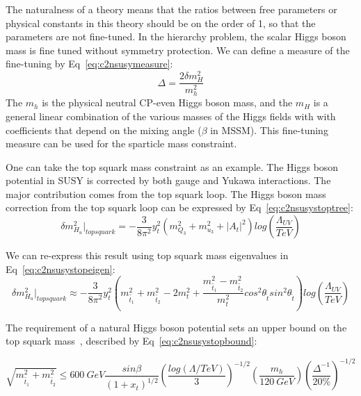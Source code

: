 The naturalness of a theory means that the ratios between free parameters or physical constants in this theory should be on the order of 1, so that the parameters are not fine-tuned. In the hierarchy problem, the scalar Higgs boson mass is fine tuned without symmetry protection. We can define a measure of the fine-tuning by Eq~\ref{eq:c2nsusymeasure}:
\begin{equation}
 \Delta = \frac{2\delta m_{H}^{2}}{m_{h}^{2}}
 \label{eq:c2nsusymeasure}
\end{equation}
The $m_{h}$ is the physical neutral CP-even Higgs boson mass, and the $m_{H}$ is a general linear combination of the various masses of the Higgs fields with with coefficients that depend on the mixing angle ($\beta$ in MSSM). This fine-tuning measure can be used for the sparticle mass constraint. 

One can take the top squark mass constraint as an example. The Higgs boson potential in SUSY is corrected by both gauge and Yukawa interactions. The major contribution comes from the top squark loop. The Higgs boson mass correction from the top squark loop can be expressed by Eq~\ref{eq:c2nsusystoptree}: 
\begin{equation}
 \delta m_{H_{u}}^{2}|_{top squark} = - \frac{3}{8\pi^{2}}y_{t}^{2}(m_{Q_{3}}^{2}+m_{u_{3}}^{2}+|A_{t}|^{2})log(\frac{\Lambda_{UV}}{TeV})
 \label{eq:c2nsusystoptree}
\end{equation}

We can re-express this result using top squark mass eigenvalues in Eq~\ref{eq:c2nsusystopeigen}:
\begin{equation}
	\delta m_{H_{u}}^{2}|_{top squark} \approx - \frac{3}{8\pi^{2}}y_{t}^{2}(m_{\tilde{t_{1}}}^{2}+m_{\tilde{t_{2}}}^{2}-2m_{t}^{2}+\frac{m_{\tilde{t_{1}}}^{2}-m_{\tilde{t_{2}}}^{2}}{m_{t}^{2}}cos^{2}\theta_{\tilde{t}}sin^{2}\theta_{\tilde{t}})log(\frac{\Lambda_{UV}}{TeV})
 \label{eq:c2nsusystopeigen}
\end{equation}

The requirement of a natural Higgs boson potential sets an upper bound on the top squark mass~\cite{Papucci:2011wy}, described by Eq~\ref{eq:c2nsusystopbound}:

\begin{equation}
 \sqrt{m_{\tilde{t_{1}}}^{2}+m_{\tilde{t_{2}}}^{2}} \leq 600~GeV\frac{sin\beta}{(1+x_{t})^{1/2}} (\frac{log(\Lambda/TeV)}{3})^{-1/2}(\frac{m_{h}}{120~GeV})(\frac{\Delta^{-1}}{20\%})^{-1/2}
 \label{eq:c2nsusystopbound}
\end{equation}

